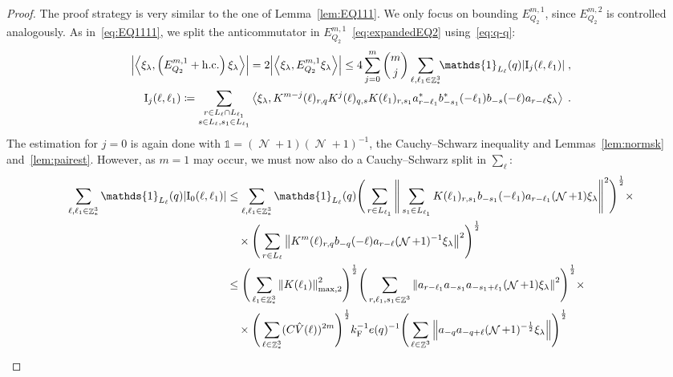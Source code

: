 \documentclass[12pt,a4paper]{article}
\numberwithin{equation}{section}
\newcommand{\1}{\mathbb{I}}
\newcommand{\F}{\mathrm{F}}
\newcommand{\I}{\mathrm{I}}
\DeclareMathOperator{\Z}{\mathbb{Z}}
\DeclareMathOperator{\NN}{\mathcal{N}}
\newcommand{\half}{\frac{1}{2}}
\newcommand{\eva}[1]{\left\langle #1 \right\rangle}
\theoremstyle{plain}
\theoremstyle{definition}
\theoremstyle{remark}
\theoremstyle{plain}
\theoremstyle{definition}
\theoremstyle{remark}
\begin{document}
\begin{proof}
The proof strategy is very similar to the one of Lemma~\ref{lem:EQ111}. We only focus on bounding $ E^{m,1}_{Q_2} $, since $ E^{m,2}_{Q_2} $ is controlled analogously.
As in~\eqref{eq:EQ1111}, we split the anticommutator in $ E^{m,1}_{Q_2} $~\eqref{eq:expandedEQ2} using~\eqref{eq:q-q}:
\begin{equation} \label{eq:EQ2111}
\begin{aligned}
	\abs{\eva{\xi_\lambda,\left(E^{m,1}_{Q_2}+\mathrm{h.c.}\right) \xi_\lambda }} 
	= 2\abs{\eva{\xi_\lambda, E^{m,1}_{Q_2} \xi_\lambda }}
	\le 4 \sum_{j=0}^m {{m}\choose j} \sum\limits_{\ell,\ell_1 \in \Z^3_*}\!\! \mathds{1}_{L_\ell}(q) |\I_j(\ell, \ell_1)| \;,\\
	\I_j(\ell, \ell_1)
	\coloneq \sum\limits_{\substack{r\in L_{\ell} \cap L_{\ell_1}\\ s \in L_{\ell},s_1\in L_{\ell_1}}}
		\eva{\xi_\lambda, K^{m-j}(\ell)_{r,q} K^{j}(\ell)_{q,s} K(\ell_1)_{r,s_1} a^*_{r-\ell_1} b^*_{-s_1}(-\ell_1) b_{-s}(-\ell) a_{r-\ell} \xi_\lambda} \;. \\
\end{aligned}
\end{equation}
The estimation for $ j = 0 $ is again done with \textcolor{green!30!black}{$\mathds{1} = (\NN+1)(\NN+1)^{-1}$}, the Cauchy--Schwarz inequality and Lemmas~\ref{lem:normsk} and~\ref{lem:pairest}. However, as $ m = 1 $ may occur, we must now also do a Cauchy--Schwarz split in $ \sum_\ell $:
\textcolor{green!30!black}{
\begin{align}
	\sum_{\ell,\ell_1 \in \Z^3_*} \mathds{1}_{L_\ell}(q) |\I_0(\ell, \ell_1)|
 	&\leq \sum\limits_{\ell,\ell_1 \in \Z^3_*} \mathds{1}_{L_\ell}(q) \Bigg( \sum\limits_{r \in L_{\ell_1}} 
 		\Bigg\Vert \sum\limits_{s_1 \in L_{\ell_1}} K(\ell_1)_{r,s_1} b_{-s_1}(-\ell_1) a_{r-\ell_1} (\NN+1) \xi_\lambda \Bigg\Vert^2\Bigg)^\half \times\nonumber\\
 	&\quad \times \Bigg( \sum\limits_{r \in L_\ell} \norm{K^{m}(\ell)_{r,q} b_{-q}(-\ell) a_{r-\ell} (\NN+1)^{-1}\xi_\lambda }^2\Bigg)^\half \nonumber\\
 	&\leq \Bigg( \sum\limits_{\ell_1 \in \Z^3_*} \norm{K(\ell_1)}_{\mathrm{max,2}}^2 \Bigg)^{\half} \Bigg(
 		\sum\limits_{r, \ell_1, s_1 \in \Z^3} \norm{a_{r-\ell_1} a_{-s_1} a_{-s_1+\ell_1} (\NN+1) \xi_\lambda}^2\Bigg)^\half \times\nonumber\\
 	&\quad \times \Bigg( \sum\limits_{\ell \in \Z^3_*}(C \hat{V}(\ell))^{2m} \Bigg)^{\half}
 		k_{\F}^{-1} e(q)^{-1}
 		\Bigg( \sum\limits_{\ell \in \Z^3} \norm{a_{-q} a_{-q + \ell} (\NN+1)^{-\half} \xi_\lambda } \Bigg)^{\half} \nonumber\\

\end{align}}
\end{proof}
\end{document}
